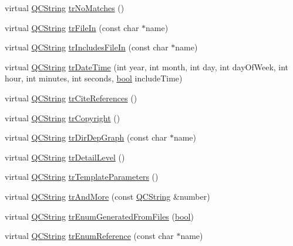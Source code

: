 \begin{DoxyCompactItemize}
\item 
virtual \hyperlink{class_q_c_string}{Q\+C\+String} \hyperlink{class_translator_korean_a988e494a80995269b735242a3a4150ae}{tr\+No\+Matches} ()
\item 
virtual \hyperlink{class_q_c_string}{Q\+C\+String} \hyperlink{class_translator_korean_a97fe67f457e6c07a3b5b9f5b42c6dfc3}{tr\+File\+In} (const char $\ast$name)
\item 
virtual \hyperlink{class_q_c_string}{Q\+C\+String} \hyperlink{class_translator_korean_a2d568d1fedd268dc68a798f79db874cd}{tr\+Includes\+File\+In} (const char $\ast$name)
\item 
virtual \hyperlink{class_q_c_string}{Q\+C\+String} \hyperlink{class_translator_korean_abf39ae7ff1f7844473f9091eed4f5888}{tr\+Date\+Time} (int year, int month, int day, int day\+Of\+Week, int hour, int minutes, int seconds, \hyperlink{qglobal_8h_a1062901a7428fdd9c7f180f5e01ea056}{bool} include\+Time)
\item 
virtual \hyperlink{class_q_c_string}{Q\+C\+String} \hyperlink{class_translator_korean_a55998cd0285a3d19fadeacc40825fbb5}{tr\+Cite\+References} ()
\item 
virtual \hyperlink{class_q_c_string}{Q\+C\+String} \hyperlink{class_translator_korean_a911c8854c48591cc1471fd4f6c1133b9}{tr\+Copyright} ()
\item 
virtual \hyperlink{class_q_c_string}{Q\+C\+String} \hyperlink{class_translator_korean_afb4e2f13f3ebe7949f1936127d730ed4}{tr\+Dir\+Dep\+Graph} (const char $\ast$name)
\item 
virtual \hyperlink{class_q_c_string}{Q\+C\+String} \hyperlink{class_translator_korean_a136e6478302ac1b2fee739f4f4053d56}{tr\+Detail\+Level} ()
\item 
virtual \hyperlink{class_q_c_string}{Q\+C\+String} \hyperlink{class_translator_korean_aeae11aa112012a4945a724857f636acf}{tr\+Template\+Parameters} ()
\item 
virtual \hyperlink{class_q_c_string}{Q\+C\+String} \hyperlink{class_translator_korean_abfd2acd5bfd7852b8184b7a9c630ffc4}{tr\+And\+More} (const \hyperlink{class_q_c_string}{Q\+C\+String} \&number)
\item 
virtual \hyperlink{class_q_c_string}{Q\+C\+String} \hyperlink{class_translator_korean_a601868bc904ff732ec99ec5886066faa}{tr\+Enum\+Generated\+From\+Files} (\hyperlink{qglobal_8h_a1062901a7428fdd9c7f180f5e01ea056}{bool})
\item 
virtual \hyperlink{class_q_c_string}{Q\+C\+String} \hyperlink{class_translator_korean_aa8db9bd724d8a6d8ff8ac1cc227c929a}{tr\+Enum\+Reference} (const char $\ast$name)

\end{DoxyCompactItemize}
